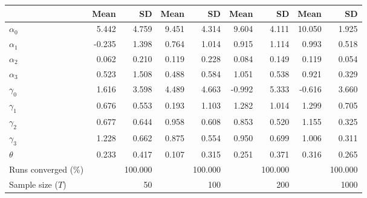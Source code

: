 
\begin{tabular}[t]{lrrrrrrrr}
\toprule
  & Mean & SD & Mean  & SD  & Mean   & SD   & Mean    & SD   \\
\midrule
$\alpha_{0}$ & 5.442 & 4.759 & 9.451 & 4.314 & 9.604 & 4.111 & 10.050 & 1.925\\
$\alpha_{1}$ & -0.235 & 1.398 & 0.764 & 1.014 & 0.915 & 1.114 & 0.993 & 0.518\\
$\alpha_{2}$ & 0.062 & 0.210 & 0.119 & 0.228 & 0.084 & 0.149 & 0.119 & 0.054\\
$\alpha_{3}$ & 0.523 & 1.508 & 0.488 & 0.584 & 1.051 & 0.538 & 0.921 & 0.329\\
$\gamma_{0}$ & 1.616 & 3.598 & 4.489 & 4.663 & -0.992 & 5.333 & -0.616 & 3.660\\
$\gamma_{1}$ & 0.676 & 0.553 & 0.193 & 1.103 & 1.282 & 1.014 & 1.299 & 0.705\\
$\gamma_{2}$ & 0.677 & 0.644 & 0.958 & 0.608 & 0.853 & 0.520 & 1.155 & 0.325\\
$\gamma_{3}$ & 1.228 & 0.662 & 0.875 & 0.554 & 0.950 & 0.699 & 1.006 & 0.311\\
$\theta$ & 0.233 & 0.417 & 0.107 & 0.315 & 0.251 & 0.371 & 0.316 & 0.265\\
Runs converged (\%) &  & 100.000 &  & 100.000 &  & 100.000 &  & 100.000\\
Sample size ($T$) &  & 50 &  & 100 &  & 200 &  & 1000\\
\bottomrule
\end{tabular}
